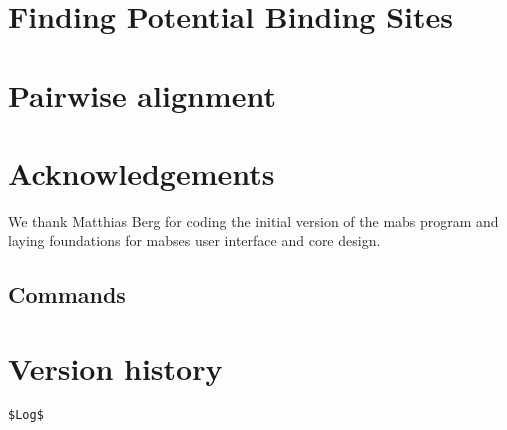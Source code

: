 \section{Finding Potential Binding Sites}
\label{sec:TFBSscan}



\section{Pairwise alignment}
\label{sec:pairalign}




\section{Acknowledgements}
\label{sec:acknow}

We thank Matthias Berg for coding the initial version of the mabs
program and laying foundations for mabses user interface and core
design.





\appendix

\begin{landscape}
\section{Commands}
\label{sec:mabscommands}
\begin{small}
%
\end{small}
\end{landscape}


\section{Version history}
\begin{verbatim}
$Log$
\end{verbatim}

